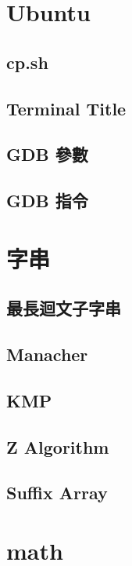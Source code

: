 
\section{Ubuntu}
    \subsection{cp.sh}
        
    \subsection{Terminal Title}
        
    \subsection{GDB 參數}
        
    \subsection{GDB 指令}
        
\clearpage

\section{字串}
    \subsection{最長迴文子字串}
         
    \subsection{Manacher}
         \columnbreak
    \subsection{KMP}
        
    \subsection{Z Algorithm}
          \columnbreak
    \subsection{Suffix Array}
        
\clearpage

\section{math}
